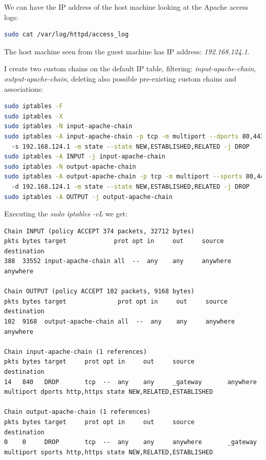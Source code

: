 \documentclass{article}
\begin{document}
We can have the IP address of the host machine looking at
the Apache access logs:

\begin{lstlisting}[language=bash]
sudo cat /var/log/httpd/access_log
\end{lstlisting}

The host machine seen from the guest machine has IP address: \emph{192.168.124.1}.

I create two custom chains on the default IP table, filtering:
\emph{input-apache-chain}, \emph{output-apache-chain}, 
deleting also possible pre-existing custom chains and associations:

\begin{lstlisting}[language=bash]
sudo iptables -F
sudo iptables -X
sudo iptables -N input-apache-chain
sudo iptables -A input-apache-chain -p tcp -m multiport --dports 80,443 
  -s 192.168.124.1 -m state --state NEW,ESTABLISHED,RELATED -j DROP
sudo iptables -A INPUT -j input-apache-chain
sudo iptables -N output-apache-chain
sudo iptables -A output-apache-chain -p tcp -m multiport --sports 80,443 
  -d 192.168.124.1 -m state --state NEW,ESTABLISHED,RELATED -j DROP
sudo iptables -A OUTPUT -j output-apache-chain
\end{lstlisting}

\noindent Executing the \emph{sudo iptables -vL} we get:

\begin{verbatim}
Chain INPUT (policy ACCEPT 374 packets, 32712 bytes)
pkts bytes target     		  prot opt in     out     source     destination         
388  33552 input-apache-chain all  --  any    any     anywhere   anywhere            

Chain OUTPUT (policy ACCEPT 102 packets, 9168 bytes)
pkts bytes target     		   prot opt in     out     source    destination         
102  9168  output-apache-chain all  --  any    any     anywhere  anywhere            

Chain input-apache-chain (1 references)
pkts bytes target     prot opt in     out     source         destination         
14   840   DROP       tcp  --  any    any     _gateway       anywhere             
multiport dports http,https state NEW,RELATED,ESTABLISHED

Chain output-apache-chain (1 references)
pkts bytes target     prot opt in     out     source         destination         
0    0     DROP       tcp  --  any    any     anywhere       _gateway             
multiport sports http,https state NEW,RELATED,ESTABLISHED
\end{verbatim}
\end{document}
